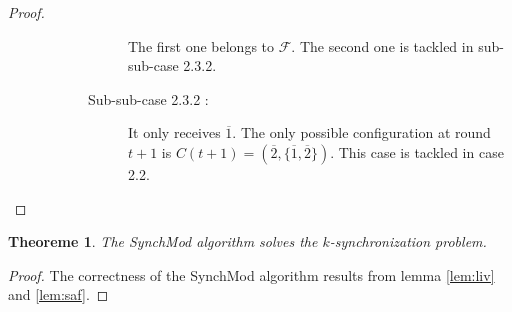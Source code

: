 \documentclass{article}
\newtheorem{theorem}{Theoreme}
\begin{document}
\begin{proof}
\begin{description}
\begin{description}
\begin{description}
							The first one belongs to $\mathcal{F}$. The second one is tackled in sub-sub-case 2.3.2.
						\item[Sub-sub-case 2.3.2 : ] It only receives $\overline{1}$.
							The only possible configuration at round $t+1$ is $C(t+1) = (\overline{2}, \{\overline{1}, \overline{2}\})$.
							This case is tackled in case 2.2.
					\end{description}
			\end{description}
	\end{description}
\end{proof}

\begin{theorem}
	The SynchMod algorithm solves the $k$-synchronization problem.
\end{theorem}
\begin{proof}
	The correctness of the SynchMod algorithm results from lemma \ref{lem:liv} and \ref{lem:saf}.
\end{proof}
\printbibliography
\end{document}
